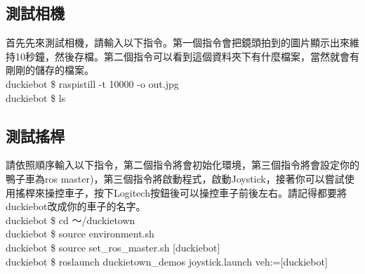 \documentclass{article}
\begin{document}
\subsection{測試相機}
首先先來測試相機，請輸入以下指令。第一個指令會把鏡頭拍到的圖片顯示出來維持10秒鐘，然後存檔。第二個指令可以看到這個資料夾下有什麼檔案，當然就會有剛剛的儲存的檔案。
\\duckiebot \$ raspistill -t 10000 -o out.jpg
\\duckiebot \$ ls

\subsection{測試搖桿}
請依照順序輸入以下指令，第二個指令將會初始化環境，第三個指令將會設定你的鴨子車為ros master)，第三個指令將啟動程式，啟動Joystick，接著你可以嘗試使用搖桿來操控車子，按下Logitech按鈕後可以操控車子前後左右。請記得都要將duckiebot改成你的車子的名字。
\\duckiebot \$ cd ～/duckietown
\\duckiebot \$ source environment.sh
\\duckiebot \$ source set\_ros\_master.sh [duckiebot]
\\duckiebot \$ roslaunch duckietown\_demos joystick.launch veh:=[duckiebot]
\end{document}
